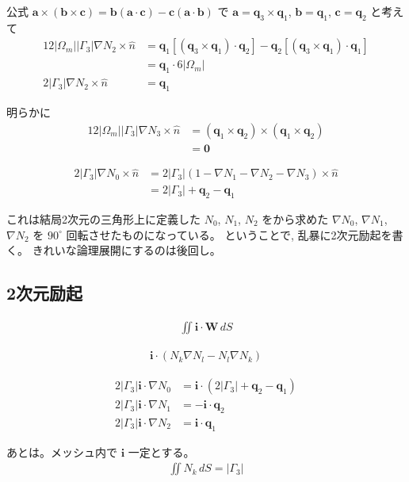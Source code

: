 公式
$\bm{a}\times\left(\bm{b}\times\bm{c}\right)
=\bm{b}\left(\bm{a}\cdot\bm{c}\right)
-\bm{c}\left(\bm{a}\cdot\bm{b}\right)$
で
$\bm{a}=\bm{q}_3\times\bm{q}_1$, $\bm{b}=\bm{q}_1$, $\bm{c}=\bm{q}_2$
と考えて
\begin{align}
12\left|\Omega_m\right|\left|\Gamma_3\right|\nabla N_2\times\hat{n}
&=\bm{q}_1\left[\left(\bm{q}_3\times\bm{q}_1\right)\cdot\bm{q}_2\right]
 -\bm{q}_2\left[\left(\bm{q}_3\times\bm{q}_1\right)\cdot\bm{q}_1\right]\\
&=\bm{q}_1\cdot6\left|\Omega_m\right|\\
2\left|\Gamma_3\right|\nabla N_2\times\hat{n}
&=\bm{q}_1
\end{align}

明らかに
\begin{align}
12\left|\Omega_m\right|\left|\Gamma_3\right|\nabla N_3\times\hat{n}
&=\left(\bm{q}_1\times\bm{q}_2\right)\times\left(\bm{q}_1\times\bm{q}_2\right)\\
&=\bm{0}
\end{align}

\begin{align}
2\left|\Gamma_3\right|\nabla N_0\times\hat{n}
&=2\left|\Gamma_3\right|
 \left(1-\nabla N_1-\nabla N_2-\nabla N_3\right)\times\hat{n}\\
&=2\left|\Gamma_3\right|+\bm{q}_2-\bm{q}_1
\end{align}

これは結局2次元の三角形上に定義した $N_0$, $N_1$, $N_2$
をから求めた $\nabla N_0$, $\nabla N_1$, $\nabla N_2$
を $90^\circ$ 回転させたものになっている。
ということで, 乱暴に2次元励起を書く。
きれいな論理展開にするのは後回し。

\subsection{2次元励起}

\begin{align}
\iint\bm{i}\cdot\bm{W}\,dS
\end{align}

\begin{align}
\bm{i}\cdot\left(N_k\nabla N_l-N_l\nabla N_k\right)
\end{align}

\begin{align}
2\left|\Gamma_3\right|\bm{i}\cdot\nabla N_0
&=\bm{i}\cdot\left(2\left|\Gamma_3\right|+\bm{q}_2-\bm{q}_1\right)\\
2\left|\Gamma_3\right|\bm{i}\cdot\nabla N_1
&=-\bm{i}\cdot\bm{q}_2\\
2\left|\Gamma_3\right|\bm{i}\cdot\nabla N_2
&=\bm{i}\cdot\bm{q}_1
\end{align}

あとは。メッシュ内で $\bm{i}$ 一定とする。
\begin{align}
\iint N_k\,dS = \left|\Gamma_3\right|
\end{align}
